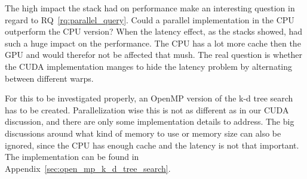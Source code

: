 The high impact the stack had on performance make an interesting question in regard to RQ~\ref{rq:parallel_query}. Could a parallel implementation in the CPU outperform the CPU version? When the latency effect, as the stacks showed, had such a huge impact on the performance. The CPU has a lot more cache then the GPU and would therefor not be affected that mush. The real question is whether the CUDA implementation manges to hide the latency problem by alternating between different warps.

For this to be investigated properly, an OpenMP version of the k-d tree search has to be created. Parallelization wise this is not as different as in our CUDA discussion, and there are only some implementation details to address. The big discussions around what kind of memory to use or memory size can also be ignored, since the CPU has enough cache and the latency is not that important. The implementation can be found in Appendix~\ref{sec:open_mp_k_d_tree_search}.




















